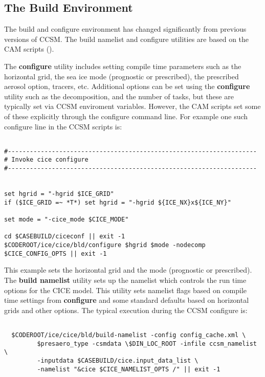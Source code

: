 
\subsection{The Build Environment}

The build and configure environment has changed significantly from previous
versions of CCSM. The build namelist and configure utilities are based on
the CAM scripts (). 

The \textbf{configure} utility includes setting compile
time parameters such as the horizontal grid, the sea ice mode (prognostic or
prescribed), the prescribed aerosol option, tracers, etc. Additional options 
can be set using the \textbf{configure} utility such as the decomposition,
and the number of tasks, but these are typically set via CCSM enviroment
variables. However, the CAM scripts set some of these explicitly through
the configure command line. For example one such configure line in the
CCSM scripts is:

\begin{verbatim}

#--------------------------------------------------------------------
# Invoke cice configure
#--------------------------------------------------------------------


set hgrid = "-hgrid $ICE_GRID"
if ($ICE_GRID =~ *T*) set hgrid = "-hgrid ${ICE_NX}x${ICE_NY}"

set mode = "-cice_mode $CICE_MODE"

cd $CASEBUILD/ciceconf || exit -1
$CODEROOT/ice/cice/bld/configure $hgrid $mode -nodecomp $CICE_CONFIG_OPTS || exit -1

\end{verbatim}

This example sets the horizontal grid and the mode (prognostic or prescribed).  The \textbf{build namelist} utility sets up the namelist which controls the
run time options for the CICE model. This utility sets namelist flags based
on compile time settings from \textbf{configure} and some standard defaults
based on horizontal grids and other options. The typical execution during
the CCSM configure is:

\begin{verbatim}

  $CODEROOT/ice/cice/bld/build-namelist -config config_cache.xml \
         $presaero_type -csmdata \$DIN_LOC_ROOT -infile ccsm_namelist \
         -inputdata $CASEBUILD/cice.input_data_list \
         -namelist "&cice $CICE_NAMELIST_OPTS /" || exit -1

\end{verbatim}

